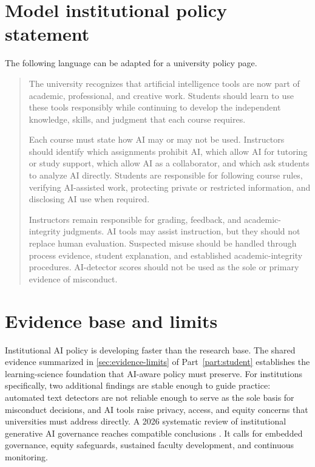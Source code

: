 \documentclass{SIAMbook2023}
\begin{document}
\section{Model institutional policy statement}
\label{u:sec:model-policy}%

The following language can be adapted for a university policy page.

\begin{quote}
The university recognizes that artificial intelligence tools are now part of academic, professional, and creative work. Students should learn to use these tools responsibly while continuing to develop the independent knowledge, skills, and judgment that each course requires.

Each course must state how AI may or may not be used. Instructors should identify which assignments prohibit AI, which allow AI for tutoring or study support, which allow AI as a collaborator, and which ask students to analyze AI directly. Students are responsible for following course rules, verifying AI-assisted work, protecting private or restricted information, and disclosing AI use when required.

Instructors remain responsible for grading, feedback, and academic-integrity judgments. AI tools may assist instruction, but they should not replace human evaluation. Suspected misuse should be handled through process evidence, student explanation, and established academic-integrity procedures. AI-detector scores should not be used as the sole or primary evidence of misconduct.
\end{quote}

\section{Evidence base and limits}
\label{u:sec:evidence-limits}

Institutional AI policy is developing faster than the research base. The shared evidence summarized in \cref{sec:evidence-limits} of Part~\ref{part:student} establishes the learning-science foundation that AI-aware policy must preserve. For institutions specifically, two additional findings are stable enough to guide practice: automated text detectors are not reliable enough to serve as the sole basis for misconduct decisions, and AI tools raise privacy, access, and equity concerns that universities must address directly. A 2026 systematic review of institutional generative AI governance reaches compatible conclusions \citep{bacalso2026institutional}. It calls for embedded governance, equity safeguards, sustained faculty development, and continuous monitoring.
\end{document}
